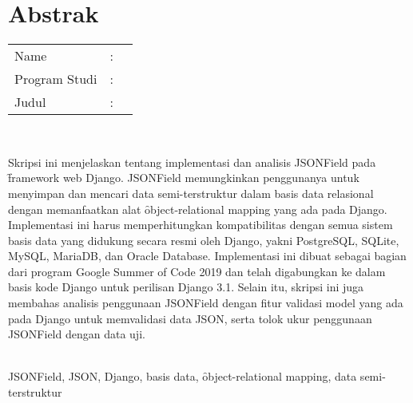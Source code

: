 %
%
%

\chapter*{Abstrak}
\singlespacing

\vspace*{0.2cm}

\noindent \begin{tabular}{l l p{10cm}}
	Name&: & \penulis \\
	Program Studi&: & \programIndonesia \\
	Judul&: & \judulIndonesia \\
\end{tabular} \\

\vspace*{0.5cm}

\noindent
Skripsi ini menjelaskan tentang implementasi dan analisis JSONField pada
\f{framework} web Django. JSONField memungkinkan penggunanya untuk menyimpan
dan mencari data semi-terstruktur dalam basis data relasional dengan
memanfaatkan alat \f{object-relational mapping} yang ada pada Django.
Implementasi ini harus memperhitungkan kompatibilitas dengan semua sistem basis
data yang didukung secara resmi oleh Django, yakni PostgreSQL, SQLite, MySQL,
MariaDB, dan Oracle Database. Implementasi ini dibuat sebagai bagian dari
program Google Summer of Code 2019 dan telah digabungkan ke dalam basis kode
Django untuk perilisan Django 3.1. Selain itu, skripsi ini juga membahas
analisis penggunaan JSONField dengan fitur validasi model yang ada pada Django
untuk memvalidasi data JSON, serta tolok ukur penggunaan JSONField dengan data
uji. \\

\vspace*{0.2cm}

\noindent {} \\
JSONField, JSON, Django, basis data, \f{object-relational mapping}, data
semi-terstruktur \\

\onehalfspacing
\newpage
